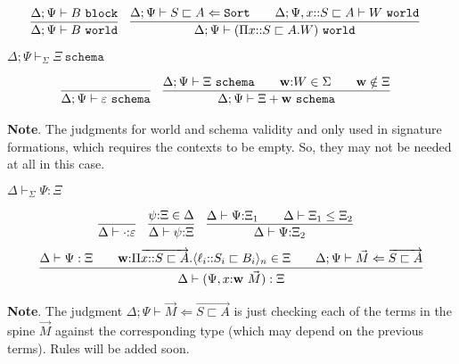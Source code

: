 \documentclass[letterpaper, 11pt]{article}
\newcommand{\Lar}{\Leftarrow}
\newcommand{\Sort}{\texttt{Sort}}
\newcommand{\block}{\texttt{block}}
\newcommand{\world}{\texttt{world}}
\newcommand{\schema}{\texttt{schema}}
\begin{document}
    \begin{align*}
      & \infer{\Delta; \Psi \vdash B \ \world}{\Delta; \Psi \vdash B \ \block} &
      & \infer{\Delta; \Psi \vdash (\Pi x{::}S \sqsubset A. W) \ \world}
              {
                \Delta; \Psi \vdash S \sqsubset A \Lar \Sort
                &&
                \Delta; \Psi, x{::} S \sqsubset A \vdash W \ \world
              }
    \end{align*}

    $\boxed{ \Delta; \Psi \vdash_\Sigma \Xi \ \schema}$

    \begin{align*}
      & \infer{\Delta; \Psi \vdash \varepsilon \ \schema}{} &
      & \infer{\Delta; \Psi \vdash \Xi + \textbf{w} \ \schema}
        {
          \Delta; \Psi \vdash \Xi \ \schema
          &&
          \textbf{w} {:} W \in \Sigma
          &&
          \textbf{w} \notin \Xi
        }
    \end{align*}
    
    \textbf{Note}.  The judgments for world and schema validity and only used in signature formations, which requires the contexts to be empty.
    So, they may not be needed at all in this case.

    $\boxed{ \Delta \vdash_\Sigma \Psi : \Xi}$
    
    \begin{align*}
      & \infer{ \Delta \vdash \cdot {:} \varepsilon}{} &
      & \infer{ \Delta \vdash \psi {:} \Xi}{\psi {:} \Xi \in \Delta} &
      & \infer{ \Delta \vdash \Psi {:} \Xi_2}
        {
           \Delta \vdash \Psi {:} \Xi_1
          &&
           \Delta \vdash \Xi_1 \leq \Xi_2
        }
    \end{align*}
    \begin{align*}
      \infer{ \Delta \vdash (\Psi, x{:} \textbf{w} \ \vec{M}) : \Xi}
            {
               \Delta \vdash \Psi : \Xi
              &&
              \textbf{w} {:} \Pi \overrightarrow{x{::}S \sqsubset A}. \langle \ell_i {::} S_i \sqsubset B_i \rangle_n \in \Xi
              &&
              \Delta; \Psi \vdash \vec{M} \Lar \overrightarrow{S \sqsubset A}
            }
    \end{align*}

    \textbf{Note}. The judgment $ \Delta; \Psi \vdash \vec{M} \Lar \overrightarrow{S \sqsubset A}$ is just checking each of the terms in the 
    spine $\vec{M}$ against the corresponding type (which may depend on the previous terms).  Rules will be added soon.
\end{document}
